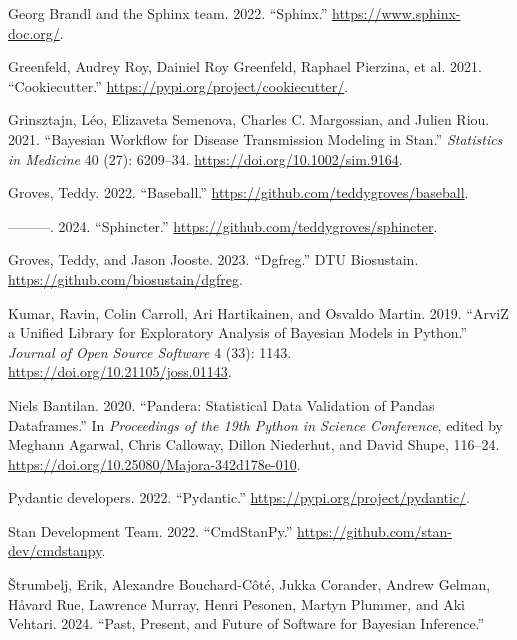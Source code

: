 \documentclass[
  letterpaper,
  DIV=11,
  numbers=noendperiod]{scrartcl}
\newlength{\cslhangindent}
\newenvironment{CSLReferences}[2] %
 {\begin{list}{}{%
  \setlength{\itemindent}{0pt}
  \setlength{\leftmargin}{0pt}
  \setlength{\parsep}{0pt}
  \ifodd #1
   \setlength{\leftmargin}{\cslhangindent}
   \setlength{\itemindent}{-1\cslhangindent}
  \fi
  \setlength{\itemsep}{#2\baselineskip}}}
 {\end{list}}
\begin{document}
\begin{CSLReferences}{1}{0}
Georg Brandl and the Sphinx team. 2022. {``Sphinx.''}
\url{https://www.sphinx-doc.org/}.

Greenfeld, Audrey Roy, Dainiel Roy Greenfeld, Raphael Pierzina, et al.
2021. {``Cookiecutter.''} \url{https://pypi.org/project/cookiecutter/}.

Grinsztajn, Léo, Elizaveta Semenova, Charles C. Margossian, and Julien
Riou. 2021. {``Bayesian Workflow for Disease Transmission Modeling in
{Stan}.''} \emph{Statistics in Medicine} 40 (27): 6209--34.
\url{https://doi.org/10.1002/sim.9164}.

Groves, Teddy. 2022. {``Baseball.''}
\url{https://github.com/teddygroves/baseball}.

---------. 2024. {``Sphincter.''}
\url{https://github.com/teddygroves/sphincter}.

Groves, Teddy, and Jason Jooste. 2023. {``Dgfreg.''} DTU Biosustain.
\url{https://github.com/biosustain/dgfreg}.

Kumar, Ravin, Colin Carroll, Ari Hartikainen, and Osvaldo Martin. 2019.
{``{ArviZ} a Unified Library for Exploratory Analysis of {Bayesian}
Models in {Python}.''} \emph{Journal of Open Source Software} 4 (33):
1143. \url{https://doi.org/10.21105/joss.01143}.

Niels Bantilan. 2020. {``Pandera: {Statistical Data Validation} of
{Pandas Dataframes}.''} In \emph{Proceedings of the 19th {Python} in
{Science Conference}}, edited by Meghann Agarwal, Chris Calloway, Dillon
Niederhut, and David Shupe, 116--24.
\url{https://doi.org/10.25080/Majora-342d178e-010}.

Pydantic developers. 2022. {``Pydantic.''}
\url{https://pypi.org/project/pydantic/}.

Stan Development Team. 2022. {``{CmdStanPy}.''}
\url{https://github.com/stan-dev/cmdstanpy}.

Štrumbelj, Erik, Alexandre Bouchard-Côté, Jukka Corander, Andrew Gelman,
Håvard Rue, Lawrence Murray, Henri Pesonen, Martyn Plummer, and Aki
Vehtari. 2024. {``Past, {Present}, and {Future} of {Software} for
{Bayesian Inference}.''}

\end{CSLReferences}
\end{document}
